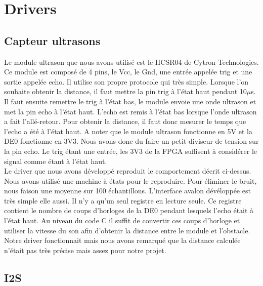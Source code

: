 \documentclass[a4paper]{article}
\begin{document}
\section{Drivers}
\subsection{Capteur ultrasons}
Le module ultrason que nous avons utilisé est le HCSR04 de Cytron Technologies.
Ce module est composé de 4 pins, le Vcc, le Gnd, une entrée appelée trig et une
sortie appelée echo. Il utilise son propre protocole qui très simple. Lorsque l'on
souhaite obtenir la distance, il faut mettre la pin trig à l'état haut pendant
10$\mu$s. Il faut ensuite remettre le trig à l'état bas, le module envoie une onde
ultrason et met la pin echo à l'état haut. L'echo est remis à l'état bas lorsque
l'onde ultrason a fait l'allé-retour. Pour obtenir la distance, il faut donc mesurer
le temps que l'echo a été à l'état haut. A noter que le module ultrason fonctionne
en 5V et la DE0 fonctionne en 3V3. Nous avons donc du faire un petit diviseur de tension
sur la pin echo. Le trig étant une entrée, les 3V3 de la FPGA suffisent à considérer
le signal comme étant à l'état haut. \\

Le driver que nous avons développé reproduit le comportement décrit ci-dessus.
Nous avons utilisé une machine à états pour le reproduire. Pour éliminer le bruit,
nous faison une moyenne sur 100 échantillons. L'interface avalon dévéloppée est
très simple elle aussi. Il n'y a qu'un seul registre en lecture seule. Ce registre
contient le nombre de coups d'horloges de la DE0 pendant lesquels l'echo était à
l'état haut. Au niveau du code C il suffit de convertir ces coups d'horloge et
utiliser la vitesse du son afin d'obtenir la distance entre le module et l'obstacle.
Notre driver fonctionnait mais nous avons remarqué que la distance calculée n'était
pas très précise mais assez pour notre projet.

\subsection{I2S}
\end{document}
